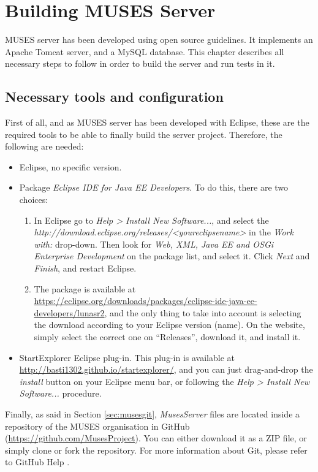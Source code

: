 \chapter{Building MUSES Server}
\label{ch:server}

MUSES server has been developed using open source guidelines. It implements an Apache Tomcat server, and a MySQL database. This chapter describes all necessary steps to follow in order to build the server and run tests in it.

\section{Necessary tools and configuration}
\label{sec:serverpreliminaries}

First of all, and as MUSES server has been developed with Eclipse, these are the required tools to be able to finally build the server project. Therefore, the following are needed:

\begin{itemize}
  \item Eclipse, no specific version.
  \item Package \textit{Eclipse IDE for Java EE Developers}. To do this, there are two choices:
  \begin{enumerate}
    \item In Eclipse go to \textit{Help > Install New Software...}, and select the \textit{http://download.eclipse.org/releases/<youreclipsename>} in the \textit{Work with:} drop-down. Then look for \textit{Web, XML, Java EE and OSGi Enterprise Development} on the package list, and select it. Click \textit{Next} and \textit{Finish}, and restart Eclipse.
    \item The package is available at \url{https://eclipse.org/downloads/packages/eclipse-ide-java-ee-developers/lunasr2}, and the only thing to take into account is selecting the download according to your Eclipse version (name). On the website, simply select the correct one on ``Releases'', download it, and install it.
  \end{enumerate} 
  \item StartExplorer Eclipse plug-in. This plug-in is available at \url{http://basti1302.github.io/startexplorer/}, and you can just drag-and-drop the \textit{install} button on your Eclipse menu bar, or following the \textit{Help > Install New Software...} procedure.
\end{itemize}

Finally, as said in Section \ref{sec:musesgit}, \textit{MusesServer} files are located inside a repository of the MUSES organisation in GitHub (\url{https://github.com/MusesProject}). You can either download it as a ZIP file, or simply clone or fork the repository. For more information about Git, please refer to GitHub Help \cite{githelp:site}.

